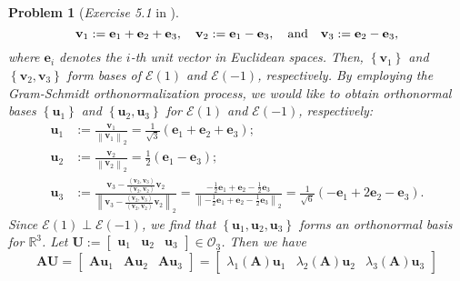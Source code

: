\documentclass[11pt]{article}
\newtheorem{problem}{Problem}
\begin{document}
\begin{problem} [\emph{Exercise 5.1} in \cite{calafiore2014optimization}]
{\begin{equation*}
    \mathbf{v}_1 := \mathbf{e}_1 + \mathbf{e}_2 + \mathbf{e}_3, \quad
    \mathbf{v}_2 := \mathbf{e}_1 - \mathbf{e}_3, \quad \textnormal{and} \quad \mathbf{v}_3 := \mathbf{e}_2 - \mathbf{e}_3,
\end{equation*}
where $\mathbf{e}_i$ denotes the $i$-th unit vector in Euclidean spaces. Then, $\left\{ \mathbf{v}_1 \right\}$ and $\left\{ \mathbf{v}_2, \mathbf{v}_3 \right\}$ form bases of $\mathcal{E}(1)$ and $\mathcal{E}(-1)$, respectively. By employing the Gram-Schmidt orthonormalization process, we would like to obtain orthonormal bases $\left\{ \mathbf{u}_1 \right\}$ and $\left\{ \mathbf{u}_2, \mathbf{u}_3 \right\}$ for $\mathcal{E}(1)$ and $\mathcal{E}(-1)$, respectively:
\begin{equation*}
    \begin{split}
        \mathbf{u}_1 &:= \frac{\mathbf{v}_1}{\left\| \mathbf{v}_1 \right\|_2} = \frac{1}{\sqrt{3}} \left( \mathbf{e}_1 + \mathbf{e}_2 + \mathbf{e}_3 \right); \\
        \mathbf{u}_2 &:= \frac{\mathbf{v}_2}{\left\| \mathbf{v}_2 \right\|_2} = \frac{1}{2} \left( \mathbf{e}_1 - \mathbf{e}_3 \right); \\
        \mathbf{u}_3 &:= \frac{\mathbf{v}_3 - \frac{\left\langle \mathbf{v}_2, \mathbf{v}_3 \right\rangle}{\left\langle \mathbf{v}_2, \mathbf{v}_2 \right\rangle} \mathbf{v}_2}{\left\| \mathbf{v}_3 - \frac{\left\langle \mathbf{v}_2, \mathbf{v}_3 \right\rangle}{\left\langle \mathbf{v}_2, \mathbf{v}_2 \right\rangle} \mathbf{v}_2 \right\|_2}
        = \frac{- \frac{1}{2} \mathbf{e}_1 + \mathbf{e}_2 - \frac{1}{2} \mathbf{e}_3}{\left\| - \frac{1}{2} \mathbf{e}_1 + \mathbf{e}_2 - \frac{1}{2} \mathbf{e}_3 \right\|_2}
        = \frac{1}{\sqrt{6}} \left( - \mathbf{e}_1 + 2 \mathbf{e}_2 - \mathbf{e}_3 \right).
    \end{split}
\end{equation*}
Since $\mathcal{E}(1) \perp \mathcal{E}(-1)$, we find that $\left\{ \mathbf{u}_1, \mathbf{u}_2, \mathbf{u}_3 \right\}$ forms an orthonormal basis for $\mathbb{R}^3$. Let $\mathbf{U} := \begin{bmatrix} \mathbf{u}_1 & \mathbf{u}_2 & \mathbf{u}_3 \end{bmatrix} \in \mathcal{O}_3$. Then we have
\begin{equation}
    \label{eqn2.2}
    \mathbf{A} \mathbf{U} = 
    \begin{bmatrix} \mathbf{A} \mathbf{u}_1 & \mathbf{A} \mathbf{u}_2 & \mathbf{A} \mathbf{u}_3 \end{bmatrix}
    = \begin{bmatrix} \lambda_1 (\mathbf{A}) \mathbf{u}_1 & \lambda_2 (\mathbf{A}) \mathbf{u}_2 & \lambda_3 (\mathbf{A}) \mathbf{u}_3 \end{bmatrix}

\end{equation}}
\end{problem}
\end{document}
